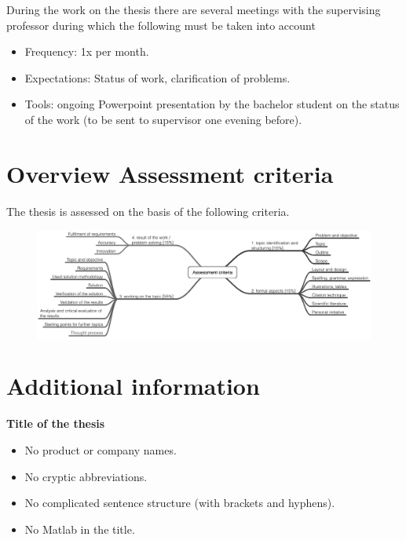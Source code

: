 \documentclass[]{cv-style} %
\begin{document}
During the work on the thesis there are several meetings with the supervising professor during which the following must be taken into account

\begin{itemize}
  \item Frequency: 1x per month.
  \item Expectations: Status of work, clarification of problems.
  \item Tools: ongoing Powerpoint presentation by the bachelor student on the status of the work (to be sent to supervisor one evening before).
\end{itemize}
\bigskip

\section{Overview Assessment criteria}
The thesis is assessed on the basis of the following criteria.

            \begin{figure}[h]
              \colorbox{white}{\includegraphics[width=\textwidth]{Assessment criteria.png}}
            \end{figure}
\pagebreak



\section{Additional information}
 \vspace{-0.2cm}
\color{black}
\textbf{Title of the thesis}
\begin{itemize}[nosep]
	\item No product or company names.
	\item No cryptic abbreviations.
	\item No complicated sentence structure (with brackets and hyphens).
	\item No Matlab in the title.
\end{itemize}
	
\end{document}
